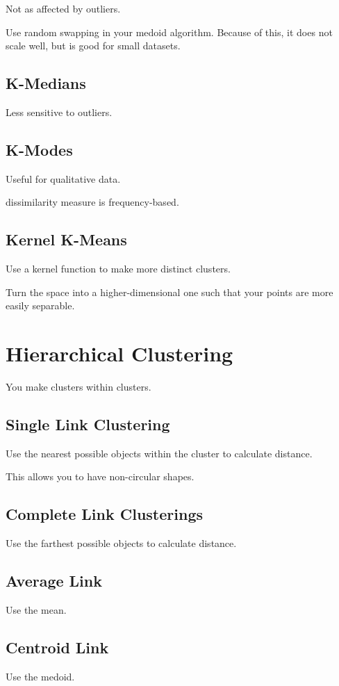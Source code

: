 \documentclass[fleqn]{report}
\begin{document}
Not as affected by outliers. 

Use random swapping in your medoid algorithm.
Because of this, it does not scale well, but is 
good for small datasets.

\subsection{K-Medians}
Less sensitive to outliers.

\subsection{K-Modes}
Useful for qualitative data. 

dissimilarity measure is frequency-based.

\subsection{Kernel K-Means}
Use a kernel function to make more distinct clusters.

Turn the space into a higher-dimensional one such that 
your points are more easily separable.

\section{Hierarchical Clustering}
You make clusters within clusters. 

\subsection{Single Link Clustering}
Use the nearest possible objects within the cluster 
to calculate distance. 

This allows you to have non-circular shapes.

\subsection{Complete Link Clusterings}
Use the farthest possible objects to calculate distance.

\subsection{Average Link}
Use the mean.

\subsection{Centroid Link}
Use the medoid.
\end{document}
